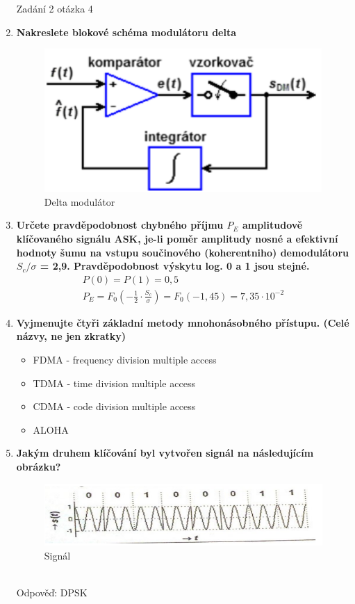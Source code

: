 \begin{enumerate}
    Zadání 2 otázka 4
    \newpage
    \item \textbf{Nakreslete blokové schéma modulátoru delta}
    \begin{figure}[h]
        \centering
        \includegraphics[scale = 0.7]{images/DM.png}
        \caption{Delta modulátor}
    \end{figure}
    \item \textbf{Určete pravděpodobnost chybného příjmu \(P_E\) amplitudově klíčovaného signálu ASK, je-li
    poměr amplitudy nosné a efektivní hodnoty šumu na vstupu součinového (koherentniho)
    demodulátoru \(S_c/\sigma\) = 2,9. Pravděpodobnost výskytu log. 0 a 1 jsou stejné.}
    \begin{gather*}
        P(0)=P(1)=0,5\\
        P_E = F_0(-\frac{1}{2}\cdot\frac{S_c}{\sigma}) = F_0(-1,45) = 7,35\cdot10^{-2}
    \end{gather*}
    \item \textbf{Vyjmenujte čtyři základní metody mnohonásobného přístupu. (Celé názvy, ne jen zkratky)}
    \begin{itemize}
        \item FDMA - frequency division multiple access
        \item TDMA - time division multiple access
        \item CDMA - code division multiple access
        \item ALOHA
    \end{itemize}
    \item \textbf{Jakým druhem klíčování byl vytvořen signál na následujícím obrázku?}\\
    \begin{figure}[h]
        \centering
        \includegraphics[scale = 0.7]{images/signal.png}
        \caption{Signál}
    \end{figure}\\
    Odpověď: DPSK
\end{enumerate}